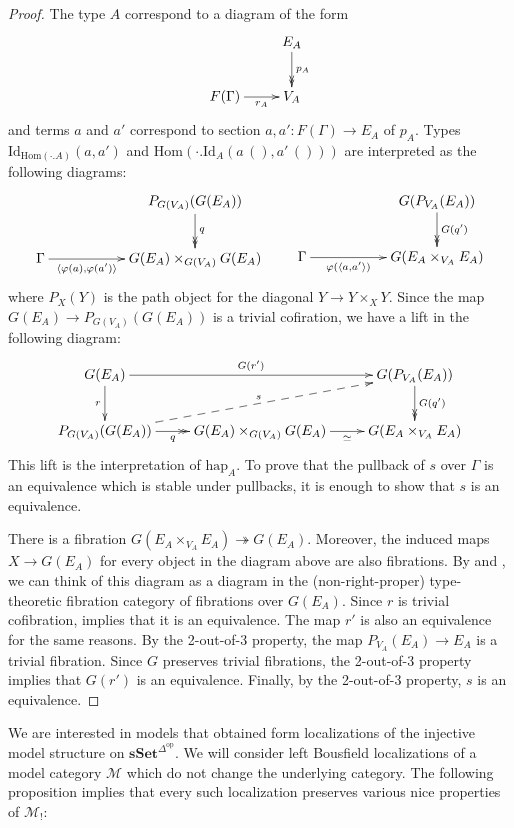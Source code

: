 \documentclass[reqno]{amsart}
\theoremstyle{definition}
\theoremstyle{remark}
\newcommand{\fs}[1]{\mathrm{#1}}
\newcommand{\cat}[1]{\mathbf{#1}}
\newcommand{\scat}[1]{\mathcal{#1}}
\newcommand{\sSet}{\cat{sSet}}
\newcommand{\Hom}{\fs{Hom}}
\newcommand{\Id}{\fs{Id}}
\numberwithin{figure}{section}
\begin{document}
\begin{proof}
The type $A$ correspond to a diagram of the form
\[ \xymatrix{                           & E_A \ar@{->>}[d]^{p_A} \\
              F(\Gamma) \ar[r]_-{r_A}   & V_A
            } \]
and terms $a$ and $a'$ correspond to section $a,a' : F(\Gamma) \to E_A$ of $p_A$.
Types $\Id_{\Hom(\cdot . A)}(a,a')$ and $\Hom(\cdot . \Id_A(a\,(),a'\,()))$ are interpreted as the following diagrams:
\[ \xymatrix{                                                           & & P_{G(V_A)}(G(E_A)) \ar@{->>}[d]^q \\
              \Gamma \ar[rr]_-{\langle \varphi(a), \varphi(a') \rangle} & & G(E_A) \times_{G(V_A)} G(E_A)
            } \qquad
   \xymatrix{                                                   & & G(P_{V_A}(E_A)) \ar@{->>}[d]^{G(q')} \\
              \Gamma \ar[rr]_-{\varphi(\langle a, a' \rangle)}  & & G(E_A \times_{V_A} E_A)
            } \]
where $P_{X}(Y)$ is the path object for the diagonal $Y \to Y \times_{X} Y$.
Since the map $G(E_A) \to P_{G(V_A)}(G(E_A))$ is a trivial cofiration, we have a lift in the following diagram:
\[ \xymatrix{ G(E_A) \ar[d]_r \ar[rr]^-{G(r')}                      &                                               & G(P_{V_A}(E_A)) \ar@{->>}[d]^{G(q')} \\
              P_{G(V_A)}(G(E_A)) \ar@{->>}[r]_-q \ar@{-->}[urr]^s   & G(E_A) \times_{G(V_A)} G(E_A) \ar[r]_-\simeq  & G(E_A \times_{V_A} E_A)
            } \]
This lift is the interpretation of $\fs{hap}_A$.
To prove that the pullback of $s$ over $\Gamma$ is an equivalence which is stable under pullbacks, it is enough to show that $s$ is an equivalence.

There is a fibration $G(E_A \times_{V_A} E_A) \twoheadrightarrow G(E_A)$.
Moreover, the induced maps $X \to G(E_A)$ for every object in the diagram above are also fibrations.
By  and , we can think of this diagram as a diagram in the (non-right-proper) type-theoretic fibration category of fibrations over $G(E_A)$.
Since $r$ is trivial cofibration, \cite[Lemma~3.6]{shul-inv} implies that it is an equivalence.
The map $r'$ is also an equivalence for the same reasons.
By the 2-out-of-3 property, the map $P_{V_A}(E_A) \to E_A$ is a trivial fibration.
Since $G$ preserves trivial fibrations, the 2-out-of-3 property implies that $G(r')$ is an equivalence.
Finally, by the 2-out-of-3 property, $s$ is an equivalence.
\end{proof}

We are interested in models that obtained form localizations of the injective model structure on $\sSet^{\Delta^\fs{op}}$.
We will consider left Bousfield localizations of a model category $\scat{M}$ which do not change the underlying category.
The following proposition implies that every such localization preserves various nice properties of $\scat{M}_!$:
\end{document}
